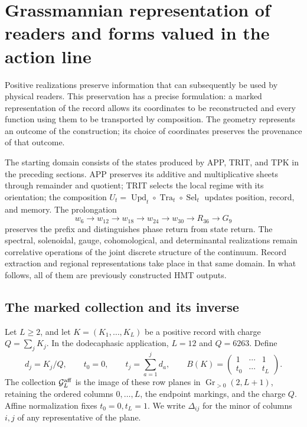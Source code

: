 \section{Grassmannian representation of readers and forms valued in the action line}
\label{sec:compat-lectores-formas}

Positive realizations preserve information that can subsequently be
used by physical readers. This preservation has a precise
formulation: a marked representation of the record allows its
coordinates to be reconstructed and every function using them to be transported by composition.
The geometry represents an outcome of the construction; its choice of
coordinates preserves the provenance of that outcome.

The starting domain consists of the states produced by APP,
TRIT, and TPK in the preceding sections. APP preserves its additive and
multiplicative sheets through remainder and quotient; TRIT selects the local
regime with its orientation; the composition
\(U_t=\operatorname{Upd}_t\circ\operatorname{Tra}_t\circ
\operatorname{Sel}_t\) updates position, record, and memory.
The prolongation
\[
 w_6\longrightarrow w_{12}\longrightarrow w_{18}\longrightarrow
 w_{24}\longrightarrow w_{30}\longrightarrow R_{36}\longrightarrow G_9
\]
preserves the prefix and distinguishes phase return from state return.
The spectral, solenoidal, gauge, cohomological, and determinantal realizations
remain correlative operations of the joint discrete
structure of the continuum. Record extraction and regional
representations take place in that same domain. In what follows, all of them
are previously constructed HMT outputs.

\subsection{The marked collection and its inverse}

Let \(L\geq2\), and let \(K=(K_1,\ldots,K_L)\) be a positive record
with charge \(Q=\sum_jK_j\). In the dodecaphasic application,
\(L=12\) and \(Q=6263\). Define
\[
 d_j=K_j/Q,\qquad t_0=0,\qquad
 t_j=\sum_{a=1}^{j}d_a,\qquad
 B(K)=\begin{pmatrix}1&\cdots&1\\t_0&\cdots&t_L\end{pmatrix}.
\]
The collection \(\mathcal G_L^{\rm aff}\) is the image of these row
planes in \(\operatorname{Gr}_{>0}(2,L+1)\), retaining the
ordered columns \(0,\ldots,L\), the endpoint markings, and the charge
\(Q\). Affine normalization fixes \(t_0=0,t_L=1\).
We write \(\Delta_{ij}\) for the minor of columns \(i,j\)
of any representative of the plane.

